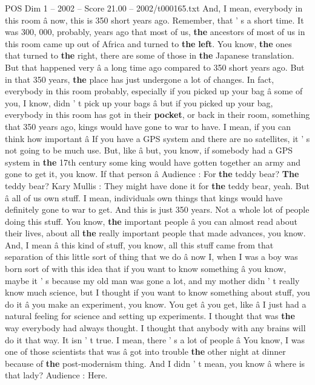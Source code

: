 \begin{textsample}{POS Dim 1 – 2002 – Score 21.00 – 2002/t000165.txt}
And, I mean, everybody in this room â now, this is 350 short years ago.
Remember, that ' s a short time.
It was 300, 000, probably, years ago that most of us, \textbf{the} ancestors of most of us in this room came up out of Africa and turned to \textbf{the} \textbf{left}.
You know, \textbf{the} ones that turned to \textbf{the} right, there are some of those in \textbf{the} Japanese translation.
But that happened very â a long time ago compared to 350 short years ago.
But in that 350 years, \textbf{the} place has just undergone a lot of changes.
In fact, everybody in this room probably, especially if you picked up your bag â some of you, I know, didn ' t pick up your bags â but if you picked up your bag, everybody in this room has got in their \textbf{pocket}, or back in their room, something that 350 years ago, kings would have gone to war to have.
I mean, if you can think how important â If you have a GPS system and there are no satellites, it ' s not going to be much use.
But, like â but, you know, if somebody had a GPS system in \textbf{the} 17th century some king would have gotten together an army and gone to get it, you know.
If that person â Audience : For \textbf{the} teddy bear? \textbf{The} teddy bear?
Kary Mullis : They might have done it for \textbf{the} teddy bear, yeah.
But â all of us own stuff.
I mean, individuals own things that kings would have definitely gone to war to get.
And this is just 350 years.
Not a whole lot of people doing this stuff.
You know, \textbf{the} important people â you can almost read about their lives, about all \textbf{the} really important people that made advances, you know.
And, I mean â this kind of stuff, you know, all this stuff came from that separation of this little sort of thing that we do â now I, when I was a boy was born sort of with this idea that if you want to know something â you know, maybe it ' s because my old man was gone a lot, and my mother didn ' t really know much science, but I thought if you want to know something about stuff, you do it â you make an experiment, you know.
You get â you get, like â I just had a natural feeling for science and setting up experiments.
I thought that was \textbf{the} way everybody had always thought.
I thought that anybody with any brains will do it that way.
It isn ' t true.
I mean, there ' s a lot of people â You know, I was one of those scientists that was â got into trouble \textbf{the} other night at dinner because of \textbf{the} post-modernism thing.
And I didn ' t mean, you know â where is that lady?
Audience : Here.

\end{textsample}
